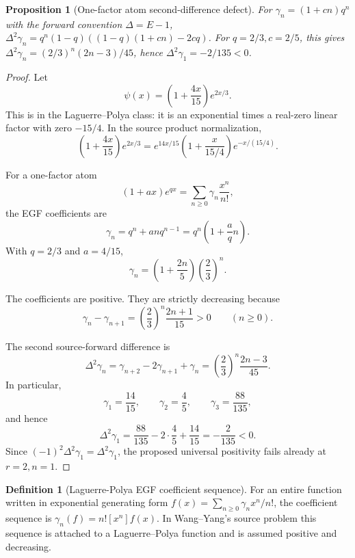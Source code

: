 \documentclass[11pt]{article}
\numberwithin{equation}{section}
\newtheorem{proposition}[theorem]{Proposition}
\theoremstyle{definition}
\newtheorem{definition}{Definition}[section]
\theoremstyle{remark}
\newcommand{\1}{\mathbf 1}
\begin{document}
\begin{proposition}[One-factor atom second-difference defect]
\label{res:egf-onefactor-atom-seconddifference-defect}
For \(\gamma_n=(1+c n)q^n\) with the forward convention \(\Delta=E-1\), \(\Delta^2\gamma_n=q^n(1-q)((1-q)(1+c n)-2cq)\). For \(q=2/3,c=2/5\), this gives \(\Delta^2\gamma_n=(2/3)^n(2n-3)/45\), hence \(\Delta^2\gamma_1=-2/135<0\).
\end{proposition}

\begin{proof}
Let
\[
\psi(x)=\left(1+\frac{4x}{15}\right)e^{2x/3}.
\]
This is in the Laguerre--Polya class: it is an exponential times a real-zero linear factor with zero \(-15/4\). In the source product normalization,
\[
\left(1+\frac{4x}{15}\right)e^{2x/3}
=e^{14x/15}\left(1+\frac{x}{15/4}\right)e^{-x/(15/4)}.
\]

For a one-factor atom
\[
(1+a x)e^{q x}=\sum_{n\ge0}\gamma_n\frac{x^n}{n!},
\]
the EGF coefficients are
\[
\gamma_n=q^n+a n q^{n-1}
=q^n\left(1+\frac{a}{q}n\right).
\]
With \(q=2/3\) and \(a=4/15\),
\[
\gamma_n=\left(1+\frac{2n}{5}\right)\left(\frac23\right)^n.
\]

The coefficients are positive. They are strictly decreasing because
\[
\gamma_n-\gamma_{n+1}
=\left(\frac23\right)^n\frac{2n+1}{15}>0
\qquad(n\ge0).
\]

The second source-forward difference is
\[
\Delta^2\gamma_n=\gamma_{n+2}-2\gamma_{n+1}+\gamma_n
=\left(\frac23\right)^n\frac{2n-3}{45}.
\]
In particular,
\[
\gamma_1=\frac{14}{15},\qquad
\gamma_2=\frac45,\qquad
\gamma_3=\frac{88}{135},
\]
and hence
\[
\Delta^2\gamma_1
=\frac{88}{135}-2\cdot\frac45+\frac{14}{15}
=-\frac{2}{135}<0.
\]
Since \((-1)^2\Delta^2\gamma_1=\Delta^2\gamma_1\), the proposed universal positivity fails already at \(r=2,n=1\).
\end{proof}

\begin{definition}[Laguerre-Polya EGF coefficient sequence]
\label{res:lp-egf-coefficient-sequence}
For an entire function written in exponential generating form \(f(x)=\sum_{n\ge0}\gamma_n x^n/n!\), the coefficient sequence is \(\gamma_n(f)=n![x^n]f(x)\). In Wang--Yang's source problem this sequence is attached to a Laguerre--Polya function and is assumed positive and decreasing.
\end{definition}
\end{document}
